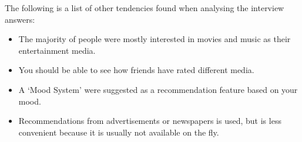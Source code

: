 The following is a list of other tendencies found when analysing the interview answers:

\begin{itemize}
	\item The majority of people were mostly interested in movies and music as their entertainment media.
	\item You should be able to see how friends have rated different media.
	\item A ‘Mood System’ were suggested as a recommendation feature based on your mood.
	\item Recommendations from advertisements or newspapers is used, but is less convenient because it is usually not available on the fly.

\end{itemize}

